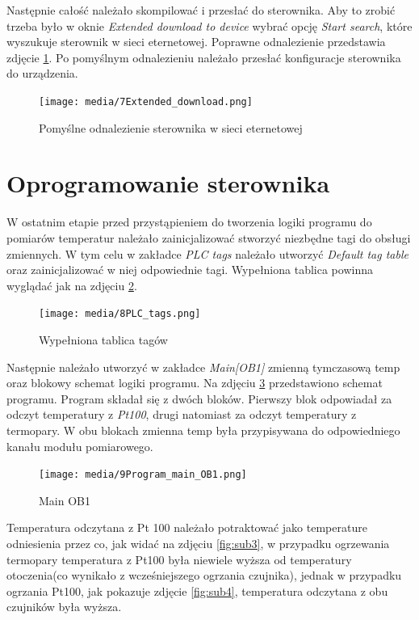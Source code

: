 \documentclass{article}
\begin{document}
\newpage
Następnie całość należało skompilować i przesłać do sterownika. 
Aby to zrobić trzeba było w oknie \textit{Extended download to device} wybrać opcję \textit{Start search}, które wyszukuje sterownik w sieci eternetowej. Poprawne odnalezienie przedstawia zdjęcie \ref{fig:Extdown}. Po pomyślnym odnalezieniu należało przesłać konfiguracje sterownika do urządzenia. 
\begin{figure}[H]
    \centering
    \texttt{[image: media/7Extended\_download.png]}
    \caption{Pomyślne odnalezienie sterownika w sieci eternetowej}
    \label{fig:Extdown}    
\end{figure}


\newpage
\section{Oprogramowanie sterownika}
W ostatnim etapie przed przystąpieniem do tworzenia logiki programu do pomiarów temperatur należało zainicjalizować stworzyć niezbędne tagi do obsługi zmiennych. W tym celu w zakładce \textit{PLC tags} należało utworzyć \textit{Default tag table} oraz zainicjalizować w niej odpowiednie tagi. Wypełniona tablica powinna wyglądać jak na zdjęciu \ref{fig:tagi}.

\begin{figure}[H]
    \centering
    \texttt{[image: media/8PLC\_tags.png]}
    \caption{Wypełniona tablica tagów}
    \label{fig:tagi}    
\end{figure}


\newpage
Następnie należało utworzyć w zakładce \textit{Main[OB1]} zmienną tymczasową temp oraz blokowy schemat logiki programu. Na zdjęciu \ref{fig:bloki} przedstawiono schemat programu. Program składał się z dwóch bloków. Pierwszy blok odpowiadał za odczyt temperatury z \textit{Pt100}, drugi natomiast za odczyt temperatury z termopary. W obu blokach zmienna temp była przypisywana do odpowiedniego kanału modułu pomiarowego.

\begin{figure}[H]
    \centering
    \texttt{[image: media/9Program\_main\_OB1.png]}
    \caption{Main OB1}
    \label{fig:bloki}    
\end{figure}


\newpage
Temperatura odczytana z Pt 100 należało potraktować jako temperature odniesienia przez co, jak widać na zdjęciu \ref{fig:sub3}, w przypadku ogrzewania termopary temperatura z Pt100 była niewiele wyższa od temperatury otoczenia(co wynikało z wcześniejszego ogrzania czujnika), jednak w przypadku ogrzania Pt100, jak pokazuje zdjęcie \ref{fig:sub4}, temperatura odczytana z obu czujników była wyższa. 
\end{document}
